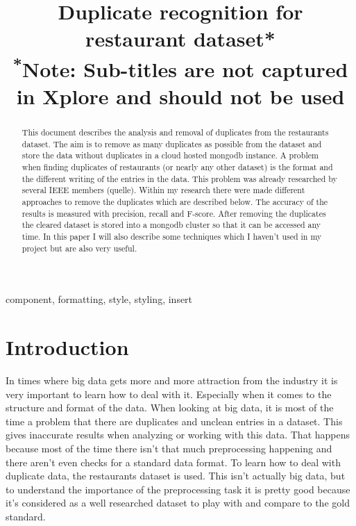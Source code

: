 \documentclass[conference]{IEEEtran}
\begin{document}
\title{Duplicate recognition for restaurant dataset*\\
{\footnotesize \textsuperscript{*}Note: Sub-titles are not captured in Xplore and
should not be used}
}

\author{
}

\maketitle

\begin{abstract}
This document describes the analysis and removal of duplicates from the restaurants dataset. The aim is to remove as many duplicates as possible from the dataset and store the data without duplicates in a cloud hosted mongodb instance. A problem when finding duplicates of restaurants (or nearly any other dataset) is the format and the different writing of the entries in the data. This problem was already researched by several IEEE members (quelle). Within my research there were made different approaches to remove the duplicates which are described below. The accuracy of the results is measured with precision, recall and F-score. After removing the duplicates the cleared dataset is stored into a mongodb cluster so that it can be accessed any time. In this paper I will also describe some techniques which I haven't used in my project but are also very useful. 

\end{abstract}

\begin{IEEEkeywords}
component, formatting, style, styling, insert
\end{IEEEkeywords}

\section{Introduction}
In times where big data gets more and more attraction from the industry it is very important to learn how to deal with it. Especially when it comes to the structure and format of the data. When looking at big data, it is most of the time a problem that there are duplicates and unclean entries in a dataset. This gives inaccurate results when analyzing or working with this data. That happens because most of the time there isn't that much preprocessing happening and there aren't even checks for a standard data format. To learn how to deal with duplicate data, the restaurants dataset is used. This isn't actually big data, but to understand the importance of the preprocessing task it is pretty good because it's considered as a well researched dataset to play with and compare to the gold standard. 
\end{document}
